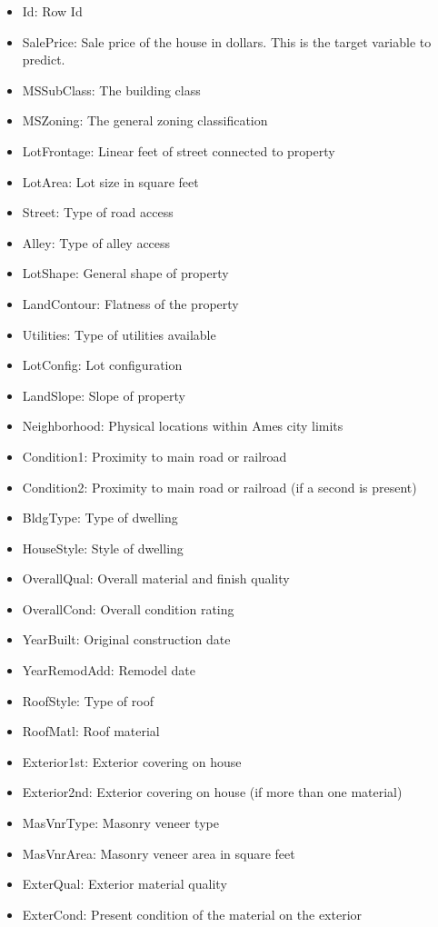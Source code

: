 \documentclass[sigconf]{acmart}
\begin{document}
	\begin{itemize}
	\item Id: Row Id
	\item SalePrice: Sale price of the house in dollars. This is the target variable to predict.
	\item MSSubClass: The building class
	\item MSZoning: The general zoning classification
	\item LotFrontage: Linear feet of street connected to property
	\item LotArea: Lot size in square feet
	\item Street: Type of road access
	\item Alley: Type of alley access
	\item LotShape: General shape of property
	\item LandContour: Flatness of the property
	\item Utilities: Type of utilities available
	\item LotConfig: Lot configuration
	\item LandSlope: Slope of property
	\item Neighborhood: Physical locations within Ames city limits
	\item Condition1: Proximity to main road or railroad
	\item Condition2: Proximity to main road or railroad (if a second is present)
	\item BldgType: Type of dwelling
	\item HouseStyle: Style of dwelling
	\item OverallQual: Overall material and finish quality
	\item OverallCond: Overall condition rating
	\item YearBuilt: Original construction date
	\item YearRemodAdd: Remodel date
	\item RoofStyle: Type of roof
	\item RoofMatl: Roof material
	\item Exterior1st: Exterior covering on house
	\item Exterior2nd: Exterior covering on house (if more than one material)
	\item MasVnrType: Masonry veneer type
	\item MasVnrArea: Masonry veneer area in square feet
	\item ExterQual: Exterior material quality
	\item ExterCond: Present condition of the material on the exterior

\end{itemize}
\end{document}
